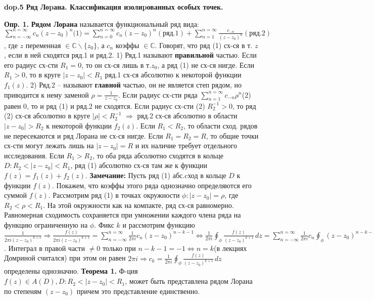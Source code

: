 \textbf{\LARGE dop.5 Ряд Лоpана. Классификация изолиpованных особых точек.}

\textbf{Опр. 1.}
\textbf{Рядом Лорана} называется функциональный ряд вида: $\sum_{n=-\infty}^{n=\infty}c_n(z-z_0)^n\text{(1)} = \sum_{n=0}^{n=\infty}c_n(z-z_0)^n(\text{ряд.1}) +  \sum_{n=1}^{n=\infty}\frac{c_{-n}}{(z-z_0)^n}(\text{ряд.2})$, где $z$ переменная $\in \mathbb{C}\backslash\{z_0\}$, а $c_n$ коэффы $\in \mathbb{C}$.
\noindent Говорят, что ряд (1) сх-ся в т. $z$, если в ней сходятся ряд.1 и ряд.2.
    1) Ряд.1 называют \textbf{правильной} частью. Если его радиус сх-сти $R_1=0$, то он сх-ся лишь в т.$z_0$, а ряд (1) не сх-ся нигде. Если $R_1>0$, то в круге $|z-z_0|<R_1$ ряд.1 сх-ся абсолютно к некоторой функции $f_1(z)$.
    2) Ряд.2 -- называют \textbf{главной} частью, он не является степ рядом, но приводится к нему заменой $\rho = \frac{1}{z-z_0}$. Если радиус сх-сти ряда $\sum_{n=1}^{n=\infty}c_{-n}\rho^n$(2) равен 0, то и ряд (1) и ряд.2 не сходятся. Если радиус сх-сти (2) $R^{-1}_2 > 0$, то ряд (2) сх-ся абсолютно в круге $|\rho|<R^{-1}_2$ $\Rightarrow$ ряд.2 сх-ся абсолютно в области $|z-z_0|>R_2$  к некоторой функции $f_2(z)$. Если $R_1<R_2$, то области сход. рядов не пересекаются и ряд Лорана не сх-ся нигде. Если $R_1=R_2=R$, то общие точки сх-сти могут лежать лишь на $|z-z_0|=R$ и их наличие требует отдельного исследования. Если $R_1>R_2$, то оба ряда абсолютно сходятся в кольце $D: R_2<|z-z_0|<R_1$, ряд (1) абсолютно сх-ся там же к функции $f(z) = f_1(z)+f_2(z)$.
\textbf{Замечание:} Пусть ряд (1) абс.cход в кольце $D$ к функции $f(z)$. Покажем, что коэффы этого ряда однозначно определяются его суммой $f(z)$. Рассмотрим ряд (1) в точках окружности $\phi: |z-z_0|=\rho$, где $R_2<\rho<R_1$. На этой окружности как на компакте, ряд сх-ся равномерно. Равномерная сходимость сохраняется при умножении каждого члена ряда на функцию ограниченную на $\phi$. Фикс $k$ и рассмотрим функцию $\frac{1}{2\pi i(z-z_0)^{k+1}} \Rightarrow \frac{f(z)}{2\pi i(z-z_0)^{k+1}} = \sum_{n=-\infty}^{n=\infty}\frac{1}{2\pi i}c_n(z-z_0)^{n-k-1} \Longleftrightarrow \frac{1}{2\pi i} \oint_\phi \frac{f(z)}{(z-z_0)^{k+1}} \,dz = \sum_{n=-\infty}^{n=\infty}\frac{1}{2\pi i}c_n\oint_\phi(z-z_0)^{n-k-1} \,dz$. Интеграл в правой части $\neq0$ только при $n-k-1=-1 \Longleftrightarrow n=k$(в лекциях Домриной считался) при этом он равен $2\pi i \Rightarrow c_k = \frac{1}{2\pi i} \oint_\phi \frac{f(z)}{(z-z_0)^{k+1}} \,dz$ определены однозначно.
\textbf{Теорема 1.}
    Ф-ция $f(z)\in A(D), D: R_2<|z-z_0|<R_1$, может быть представлена рядом Лорана по степеням $(z-z_0)$ причем это представление единственно.
